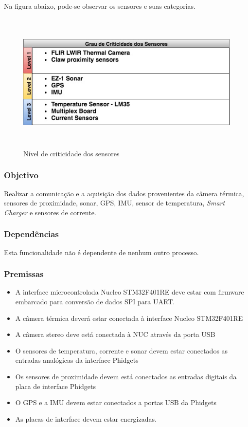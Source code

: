 Na figura abaixo, pode-se observar os sensores e suas categorias.

\begin{figure}[!ht]
	\centering
	\includegraphics[height=7cm, width=14cm]{Figures/criticidade.jpg}
	\caption{Nível de criticidade dos sensores} \label{FuncAquisition}
\end{figure}

\subsubsection{Objetivo}
Realizar a comunicação e a aquisição dos dados provenientes da câmera térmica, sensores de proximidade, sonar, GPS, IMU, sensor de temperatura, \textit{Smart Charger} e sensores de corrente.

\subsubsection{Dependências}
Esta funcionalidade não é dependente de nenhum outro processo.

\subsubsection{Premissas}
\begin{itemize}
	\item A interface microcontrolada Nucleo STM32F401RE deve estar com firmware embarcado para conversão de dados SPI para UART.
	\item A câmera térmica deverá estar conectada à interface Nucleo STM32F401RE
	\item A câmera stereo deve está conectada à NUC através da porta USB
	\item O sensores de temperatura, corrente e sonar devem estar conectados as entradas analógicas da interface Phidgets
	\item Os sensores de proximidade devem está conectados as entradas digitais da placa de interface Phidgets
	\item O GPS e a IMU devem estar conectados a portas USB da Phidgets
	\item As placas de interface devem estar energizadas.
\end{itemize}

